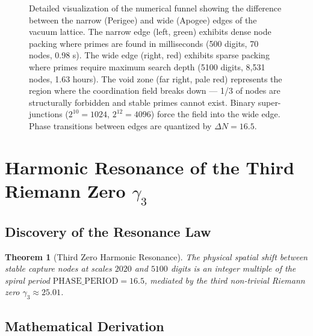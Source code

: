 \documentclass[12pt,a4paper]{article}
\newcommand{\PHASE}{\text{PHASE\_PERIOD}}
\newtheorem{theorem}{Theorem}[section]
\begin{document}
\begin{landscape}
\begin{figure}[H]
		\caption{Detailed visualization of the numerical funnel showing the difference between the narrow (Perigee) and wide (Apogee) edges of the vacuum lattice. The narrow edge (left, green) exhibits dense node packing where primes are found in milliseconds (500 digits, 70 nodes, 0.98 s). The wide edge (right, red) exhibits sparse packing where primes require maximum search depth (5100 digits, 8,531 nodes, 1.63 hours). The void zone (far right, pale red) represents the region where the coordination field breaks down — 1/3 of nodes are structurally forbidden and stable primes cannot exist. Binary super-junctions (\(2^{10}=1024\), \(2^{12}=4096\)) force the field into the wide edge. Phase transitions between edges are quantized by \(\Delta N = 16.5\).}
		\label{fig:funnel}
	\end{figure}
\end{landscape}
\newpage

	\section{Harmonic Resonance of the Third Riemann Zero \(\gamma_3\)}
	
	\subsection{Discovery of the Resonance Law}
	
	\begin{theorem}[Third Zero Harmonic Resonance]
		The physical spatial shift between stable capture nodes at scales \(2020\) and \(5100\) digits is an integer multiple of the spiral period \(\PHASE = 16.5\), mediated by the third non-trivial Riemann zero \(\gamma_3 \approx 25.01\).
	\end{theorem}
	
	\subsection{Mathematical Derivation}
	
\end{document}

